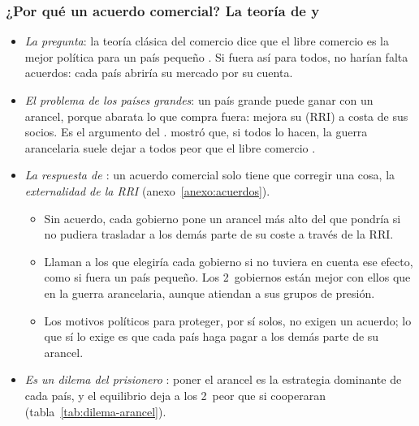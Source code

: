 \documentclass[11pt]{article}
\begin{document}
\subsubsection{¿Por qué un acuerdo comercial?\cortetitulo{} La teoría de  y }\label{sec:bagwell-staiger}

\begin{itemize}
\item \emph{La pregunta}: la teoría clásica del comercio dice que el libre comercio es la mejor política para un país pequeño . Si fuera así para todos, no harían falta acuerdos: cada país abriría su mercado por su cuenta.
\item \emph{El problema de los países grandes}: un país grande puede ganar con un arancel, porque abarata lo que compra fuera: mejora su  (RRI) a costa de sus socios. Es el argumento del  . \textcite{Johnson1953Optimum} mostró que, si todos lo hacen, la guerra arancelaria suele dejar a todos peor que el libre comercio .
\item \emph{La respuesta de \textcite{BagwellStaiger1999Economic}}: un acuerdo comercial solo tiene que corregir una cosa, la \emph{externalidad de la RRI} (anexo~\ref{anexo:acuerdos}).
  \begin{itemize}
  \item Sin acuerdo, cada gobierno pone un arancel más alto del que pondría si no pudiera trasladar a los demás parte de su coste a través de la RRI.
  \item Llaman  a los que elegiría cada gobierno si no tuviera en cuenta ese efecto, como si fuera un país pequeño. Los 2~gobiernos están mejor con ellos que en la guerra arancelaria, aunque atiendan a sus grupos de presión.
  \item Los motivos políticos para proteger, por sí solos, no exigen un acuerdo; lo que sí lo exige es que cada país haga pagar a los demás parte de su arancel.
  \end{itemize}
\item \emph{Es un dilema del prisionero} : poner el arancel es la estrategia dominante de cada país, y el equilibrio deja a los 2~peor que si cooperaran (tabla~\ref{tab:dilema-arancel}).
\end{itemize}
\end{document}
